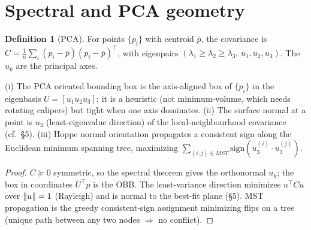 \documentclass[11pt]{article}
\theoremstyle{definition}\newtheorem{definition}{Definition}[section]
\theoremstyle{plain}\newtheorem{theorem}{Theorem}[section]
\begin{document}
\section{Spectral and PCA geometry}
\begin{definition}[PCA]
For points $\{p_i\}$ with centroid $\bar p$, the covariance is $C=\tfrac1n\sum_i(p_i-\bar p)(p_i-\bar p)^\top$,
with eigenpairs $(\lambda_1\ge\lambda_2\ge\lambda_3,\,u_1,u_2,u_3)$. The $u_k$ are the principal axes.
\end{definition}
\begin{proposition}\label{prop:pca}
(i) The PCA oriented bounding box is the axis-aligned box of $\{p_i\}$ in the eigenbasis $U=[u_1u_2u_3]$; it is
a heuristic (not minimum-volume, which needs rotating calipers) but tight when one axis dominates.
(ii) The surface normal at a point is $u_3$ (least-eigenvalue direction) of the local-neighbourhood covariance
(cf.\ \S5). (iii) Hoppe normal orientation propagates a consistent sign along the Euclidean minimum spanning
tree, maximizing $\sum_{(i,j)\in MST}\mathrm{sign}(u_3^{(i)}\!\cdot u_3^{(j)})$.
\end{proposition}
\begin{proof}
$C\succeq0$ symmetric, so the spectral theorem gives the orthonormal $u_k$; the box in coordinates $U^\top p$
is the OBB. The least-variance direction minimizes $u^\top C u$ over $\lVert u\rVert=1$ (Rayleigh) and is normal to
the best-fit plane (\S5). MST propagation is the greedy consistent-sign assignment minimizing flips on a tree
(unique path between any two nodes $\Rightarrow$ no conflict).
\end{proof}
\end{document}
